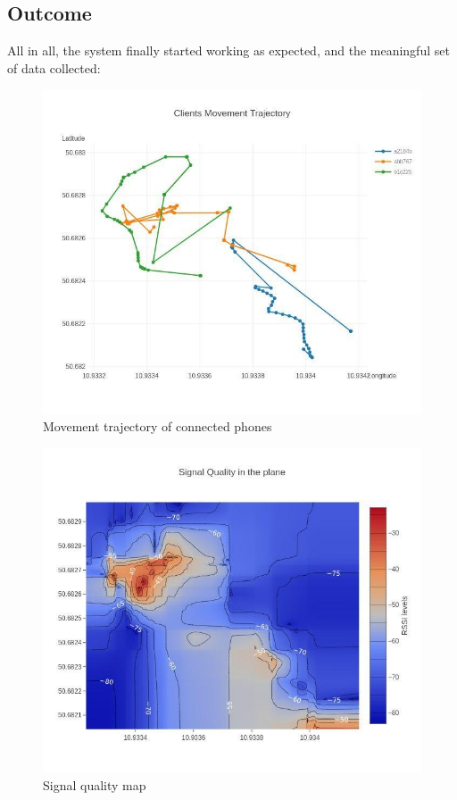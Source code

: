 \hypertarget{outcome}{%
\subsection{Outcome}\label{outcome}}

All in all, the system finally started working as expected, and the
meaningful set of data collected:

\begin{figure}[H]
	\centering
	\includegraphics[width=\linewidth,keepaspectratio]{images/experiment_3_1.jpg}
\caption{Movement trajectory of connected phones}
\end{figure}

\begin{figure}[H]
	\centering
	\includegraphics[width=\linewidth,keepaspectratio]{images/experiment_3_2.jpg}
\caption{Signal quality map}
\end{figure}

